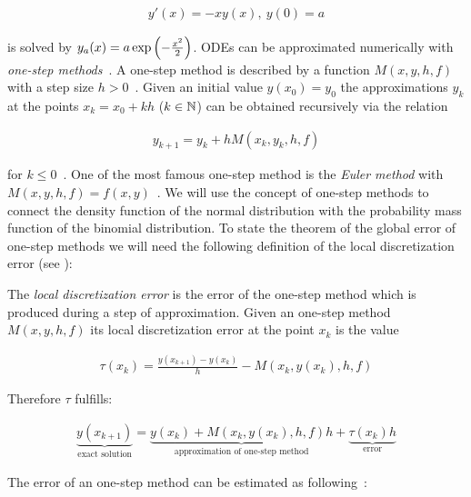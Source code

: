 \begin{align}
  y'(x) = -xy(x),\ y(0)=a
\end{align}

is solved by $y_a(x) = a \exp\left( {-\frac{x^2}2} \right)$. ODEs can be approximated numerically with \emph{one-step methods}~\cite[pp.~471~ff]{stoer}. A one-step method is described by a function $M(x,y,h,f)$ with a step size $h>0$~\cite[p.~473]{stoer}. Given an initial value $y(x_0)=y_0$ the approximations $y_k$ at the points $x_k = x_0 + kh$ ($k\in\mathbb N$) can be obtained recursively via the relation

\begin{align}
  y_{k+1} = y_k + h M(x_k, y_k, h, f)
\end{align}

for $k \le 0$~\cite[p. 473]{stoer}. One of the most famous one-step method is the \emph{Euler method} with $M(x,y,h,f) = f(x,y)$~\cite[p. 473]{stoer}. We will use the concept of one-step methods to connect the density function of the normal distribution with the probability mass function of the binomial distribution. To state the theorem of the global error of one-step methods we will need the following definition of the local discretization error (see \cite[pp. 473-474]{stoer}):

\begin{definition}
  The \emph{local discretization error} is the error of the one-step method which is produced during a step of approximation. Given an one-step method $M(x,y,h,f)$ its local discretization error at the point $x_k$ is the value

  \begin{align}
    \tau(x_k) = \frac{y(x_{k+1})-y(x_k)}h - M(x_k,y(x_k),h,f)
  \end{align}
\end{definition}

\noindent Therefore $\tau$ fulfills:

\begin{align}
  \underbrace{y(x_{k+1})}_{\text{exact solution}} = \underbrace{y(x_k) + M(x_k,y(x_k),h,f)h}_{\text{approximation of one-step method}} + \underbrace{\tau(x_k)h}_{\text{error}}
\end{align}

\noindent The error of an one-step method can be estimated as following~\cite[pp. 478-479]{stoer}:

